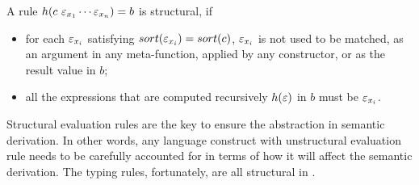 \begin{definition}
A rule $h(c~\varepsilon_{x_1}\cdots \varepsilon_{x_n})=b$ is structural, if
\begin{itemize}
  \item for each $\varepsilon_{x_i}$ satisfying $sort(\varepsilon_{x_i})=sort(c)$, 
   $\varepsilon_{x_i}$ is not used to be matched, as an argument in any meta-function, applied by any constructor, or as the result value in $b$;
  \item all the expressions that are computed recursively $h(\varepsilon)$ in $b$ must be $\varepsilon_{x_i}$.
\end{itemize}
\end{definition}

Structural evaluation rules are the key to ensure the abstraction in semantic derivation.
In other words, any language construct with unstructural evaluation rule needs to be carefully accounted for in terms of how it will affect the semantic derivation.
The typing rules, fortunately, are all structural in \STLC.
